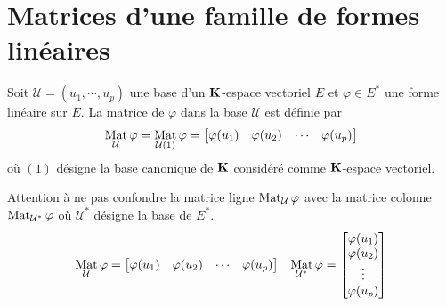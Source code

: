 \section{Matrices d'une famille de formes linéaires}
\begin{defi}
 Soit $\mathcal U =(u_1,\cdots,u_p)$ une base d'un $\mathbf{K}$-espace vectoriel $E$ et $\varphi\in E^*$ une forme linéaire sur $E$. La matrice de $\varphi$ dans la base $\mathcal U$ est définie par
\begin{displaymath}
 \mathop{\mathrm{Mat}}_{\mathcal U}\varphi = \mathop{\mathrm{Mat}}_{\mathcal U (1)}\varphi
=
\begin{bmatrix}
 \varphi(u_1) & \varphi(u_2) & \cdots & \varphi(u_p)
\end{bmatrix}
\end{displaymath}
où $(1)$ désigne la base canonique de $\mathbf{K}$ considéré comme $\mathbf{K}$-espace vectoriel.
\end{defi}
\begin{rem}
 Attention à ne pas confondre la matrice ligne $\mathop{\mathrm{Mat}}_{\mathcal U}\varphi$ avec la matrice colonne $\mathop{\mathrm{Mat}}_{\mathcal U^*}\varphi$ où $\mathcal U^*$ désigne la base de $E^*$.
\begin{align*}
 \mathop{\mathrm{Mat}}_{\mathcal U}\varphi
=
\begin{bmatrix}
 \varphi(u_1) & \varphi(u_2) & \cdots & \varphi(u_p)
\end{bmatrix}
& &
 \mathop{\mathrm{Mat}}_{\mathcal U^*}\varphi
=
\begin{bmatrix}
 \varphi(u_1) \\ \varphi(u_2) \\ \vdots \\ \varphi(u_p)
\end{bmatrix}
\end{align*}
\end{rem}

